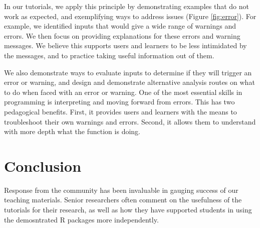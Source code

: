 \documentclass[12pt]{article}
\begin{document}
In our tutorials, we apply this principle by demonstrating examples that do not work as expected, and exemplifying ways to address issues (Figure \ref{fig:error}).
For example, we identified inputs that would give a wide range of warnings and errors.
We then focus on providing explanations for these errors and warning messages.
We believe this supports users and learners to be less intimidated by the messages, and to practice taking useful information out of them.

We also demonstrate ways to evaluate inputs to determine if they will trigger an error or warning, and design and demonstrate alternative analysis routes on what to do when faced with an error or warning.
One of the most essential skills in programming is interpreting and moving forward from errors.
This has two pedagogical benefits.
First, it provides users and learners with the means to troubleshoot their own warnings and errors.
Second, it allows them to understand with more depth what the function is doing.








\section*{Conclusion}
\label{sec:conclusion}

Response from the community has been invaluable in gauging success of our teaching materials.
Senior researchers often comment on the usefulness of the tutorials for their research, as well as how they have supported students in using the demosntrated R packages more independently.
\end{document}
